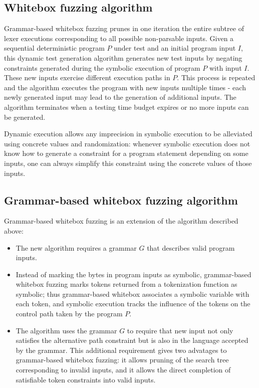 \subsection{Whitebox fuzzing algorithm}

Grammar-based whitebox fuzzing prunes in one iteration the entire subtree of lexer executions corresponding to all possible non-parsable inputs.
Given a sequential deterministic program $P$ under test and an initial program input $I$, this dynamic test generation algorithm generates new test inputs by negating constraints generated during the symbolic execution of program $P$ with input $I$. These new inputs exercise different execution paths in $P$. This process is repeated and the algorithm executes the program with new inputs multiple times - each newly generated input may lead to the generation of additional inputs. The algorithm terminates when a testing time budget expires or no more inputs can be generated.

Dynamic execution allows any imprecision in symbolic execution to be alleviated using concrete values and randomization: whenever symbolic execution does not know how to generate a constraint for a program statement depending on some inputs, one can always simplify this constraint using the concrete values of those inputs.

\subsection{Grammar-based whitebox fuzzing algorithm}

Grammar-based whitebox fuzzing is an extension of the algorithm described above:
\begin{itemize}
    \item The new algorithm requires a grammar $G$ that describes valid program inputs.
    \item Instead of marking the bytes in program inputs as symbolic, grammar-based whitebox fuzzing marks tokens returned from a tokenization function as symbolic; thus grammar-based whitebox associates a symbolic variable with each token, and symbolic execution tracks the influence of the tokens on the control path taken by the program $P$.
    \item The algorithm uses the grammar $G$ to require that new input not only satisfies the alternative path constraint but is also in the language accepted by the grammar.
    This additional requirement gives two advatages to grammar-based whitebox fuzzing: it allows pruning of the search tree corresponding to invalid inputs, and it allows the direct completion of satisfiable token constraints into valid inputs.
\end{itemize}

